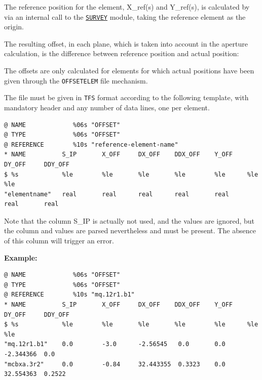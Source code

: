 The reference position for the element, X\_ref(s) and Y\_ref(s), is
calculated  by \madx via an internal call to the
\hyperref[chap:survey]{\tt SURVEY} module, taking the reference element
as the origin.   

The resulting offset, in each plane, which is taken into account in the
aperture calculation, is the difference between reference position and
actual position:  

The offsets are only calculated for elements for which actual positions 
have been given through the {\tt OFFSETELEM} file mechanism. 

The file must be given in {\tt TFS} format according to the following
template, with mandatory header and any number of data lines, one per element. 

{\small \begin{verbatim}
@ NAME             %06s "OFFSET" 
@ TYPE             %06s "OFFSET" 
@ REFERENCE        %10s "reference-element-name" 
* NAME          S_IP       X_OFF     DX_OFF    DDX_OFF    Y_OFF    DY_OFF     DDY_OFF
$ %s            %le        %le       %le       %le        %le      %le        %le
"elementname"   real       real      real      real       real     real       real
\end{verbatim}}

Note that the column S\_IP is actually not used, and the values are ignored, 
but the column and values are parsed nevertheless and must be present. 
The absence of this column will trigger an error. 

{\bf Example:}
{\small \begin{verbatim}
@ NAME             %06s "OFFSET" 
@ TYPE             %06s "OFFSET" 
@ REFERENCE        %10s "mq.12r1.b1" 
* NAME          S_IP       X_OFF     DX_OFF    DDX_OFF    Y_OFF    DY_OFF     DDY_OFF
$ %s            %le        %le       %le       %le        %le      %le        %le
"mq.12r1.b1"    0.0        -3.0      -2.56545   0.0       0.0      -2.344366  0.0
"mcbxa.3r2"     0.0        -0.84     32.443355  0.3323    0.0      32.554363  0.2522
\end{verbatim}}


